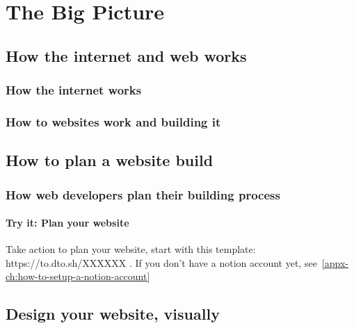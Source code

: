 \part{The Big Picture}\label{part:the-big-picture}


\chapter{How the internet and web works}\label{ch:how-the-internet-and-web-works}



\section{How the internet works}\label{sec:how-the-internet-works}


\section{How to websites work and building it}\label{sec:how-to-websites-work-and-building-it}


\chapter{How to plan a website build}\label{ch:how-to-plan-a-website-build}


\section{How web developers plan their building process}\label{sec:how-web-developers-plan-their-building-process}

\subsection{Try it: Plan your website}\label{subsec:plan-your-website}
Take action to plan your website, start with this template: https://to.dto.sh/XXXXXX . If you don't have a notion account yet, see~\ref{appx-ch:how-to-setup-a-notion-account}


\chapter{Design your website, visually}\label{ch:design-your-website-visually}


